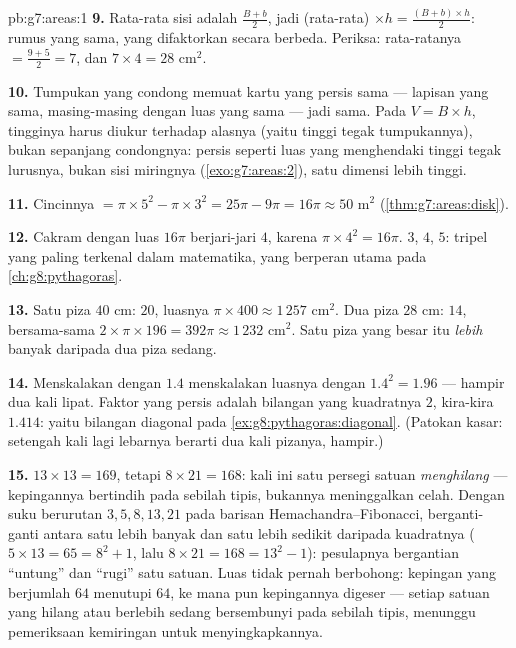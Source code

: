 \begin{solution}{pb:g7:areas:1}
\textbf{9.} Rata-rata sisi  adalah
$\frac{B + b}{2}$, jadi (rata-rata) $\times h =
\frac{(B+b) \times h}{2}$: rumus yang sama, yang difaktorkan
secara berbeda. Periksa: rata-ratanya $= \frac{9+5}{2} = 7$, dan
$7 \times 4 = 28$ cm$^2$.

\textbf{10.} Tumpukan yang condong memuat kartu yang persis sama
--- lapisan yang sama, masing-masing dengan luas yang sama --- jadi
 sama. Pada $V = B \times h$, tingginya harus diukur
\emph{} terhadap alasnya (yaitu tinggi tegak tumpukannya),
bukan sepanjang condongnya: persis seperti luas  yang
menghendaki tinggi tegak lurusnya, bukan sisi miringnya
(\cref{exo:g7:areas:2}), satu dimensi lebih tinggi.

\textbf{11.} Cincinnya $= \pi \times 5^2 - \pi \times 3^2 = 25\pi -
9\pi = 16\pi \approx 50$ m$^2$ (\cref{thm:g7:areas:disk}).

\textbf{12.} Cakram dengan luas $16\pi$ berjari-jari $4$, karena
$\pi \times 4^2 = 16\pi$.  $3$, $4$, $5$: tripel yang
paling terkenal dalam matematika, yang berperan utama pada
\cref{ch:g8:pythagoras}.

\textbf{13.} Satu piza $40$ cm:  $20$,
luasnya $\pi \times 400 \approx 1\,257$ cm$^2$. Dua piza $28$ cm:
 $14$, bersama-sama
$2 \times \pi \times 196 = 392\pi \approx 1\,232$ cm$^2$. Satu piza
yang besar itu \emph{lebih} banyak daripada dua piza sedang.

\textbf{14.} Menskalakan  dengan $1.4$ menskalakan
luasnya dengan $1.4^2 = 1.96$ --- hampir dua kali lipat. Faktor yang
persis adalah bilangan yang kuadratnya $2$, kira-kira $1.414$: yaitu
bilangan diagonal pada \cref{ex:g8:pythagoras:diagonal}. (Patokan
kasar: setengah kali lagi lebarnya berarti dua kali pizanya, hampir.)

\textbf{15.} $13 \times 13 = 169$, tetapi $8 \times 21 = 168$:
kali ini satu persegi satuan \emph{menghilang} --- kepingannya
bertindih pada sebilah tipis, bukannya meninggalkan celah. Dengan
suku berurutan $3, 5, 8, 13, 21$ pada barisan
Hemachandra--Fibonacci,  berganti-ganti antara satu
lebih banyak dan satu lebih sedikit daripada kuadratnya
($5 \times 13 = 65 = 8^2 + 1$, lalu $8 \times 21 = 168 = 13^2 - 1$):
pesulapnya bergantian ``untung'' dan ``rugi'' satu satuan. Luas tidak
pernah berbohong: kepingan yang berjumlah $64$ menutupi $64$, ke mana
pun kepingannya digeser --- setiap satuan yang hilang atau berlebih
sedang bersembunyi pada sebilah tipis, menunggu pemeriksaan
kemiringan untuk menyingkapkannya.

\end{solution}

